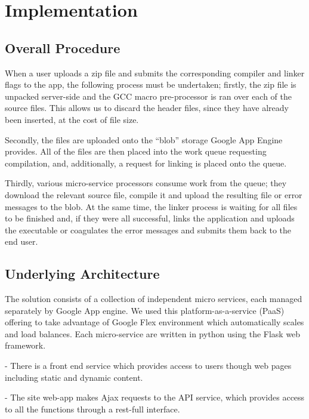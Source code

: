 \documentclass[conference]{IEEEtran}
\begin{document}

\section{Implementation}
\subsection{Overall Procedure}
When a user uploads a zip file and submits the corresponding compiler and linker
flags to the app, the following process must be undertaken; firstly, the zip
file is unpacked server-side and the GCC macro pre-processor is ran over each of
the source files. This allows us to discard the header files, since they have
already been inserted, at the cost of file size. 

Secondly, the files are uploaded onto the ``blob'' storage Google App Engine
provides. All of the files are then placed into the work queue requesting
compilation, and, additionally, a request for linking is placed onto the queue.

Thirdly, various micro-service processors consume work from the queue; they
download the relevant source file, compile it and upload the resulting file or
error messages to the blob. At the same time, the linker process is waiting for
all files to be finished and, if they were all successful, links the
application and uploads the executable or coagulates the error messages and
submits them back to the end user.
\subsection{Underlying Architecture}

The solution consists of a collection of independent micro services, each managed separately by Google App engine. We used this platform-as-a-service (PaaS) offering to take advantage of Google Flex environment which automatically scales and load balances. Each micro-service are written in python using the Flask web framework. 

- There is a front end service which provides access to users though web pages including static and dynamic content.

- The site web-app makes Ajax requests to the API service, which provides access to all the functions through a rest-full interface.
\end{document}
